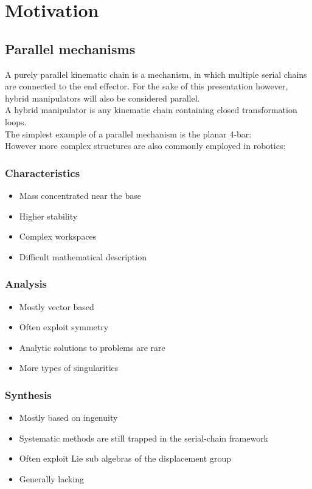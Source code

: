 \chapter{Motivation}
\section{Parallel mechanisms}

{
    A purely parallel kinematic chain is a mechanism, in which multiple serial chains are connected to the end effector.
    For the sake of this presentation however, hybrid manipulators will also be considered parallel.\\
    A hybrid manipulator is any kinematic chain containing closed transformation loops.\\
    The simplest example of a parallel mechanism is the planar 4-bar:
    \\
    However more complex structures are also commonly employed in robotics:
}
\subsection{Characteristics}
\begin{itemize}
        \item Mass concentrated near the base
        \item Higher stability
        \item Complex workspaces
        \item Difficult mathematical description
\end{itemize}

\subsection{Analysis}
\begin{itemize}
        \item Mostly vector based
        \item Often exploit symmetry
        \item Analytic solutions to problems are rare
        \item More types of singularities
\end{itemize}

\subsection{Synthesis}
\begin{itemize}
        \item Mostly based on ingenuity
        \item Systematic methods are still trapped in the serial-chain framework
        \item Often exploit Lie sub algebras of the displacement group
        \item Generally lacking
\end{itemize}

